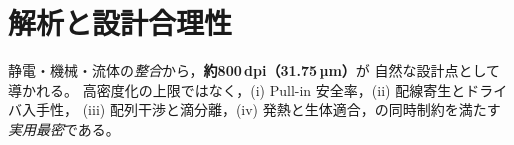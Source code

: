 \section{解析と設計合理性}
静電・機械・流体の\emph{整合}から，\textbf{約800\,dpi（31.75\,µm）}が
自然な設計点として導かれる。
高密度化の上限ではなく，(i) Pull-in 安全率，(ii) 配線寄生とドライバ入手性，
(iii) 配列干渉と滴分離，(iv) 発熱と生体適合，の同時制約を満たす\emph{実用最密}である。
